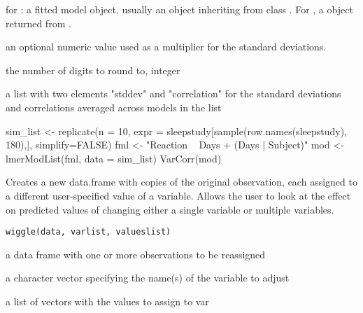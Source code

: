 \documentclass[letterpaper]{book}
\begin{document}
%
\begin{Arguments}
\begin{ldescription}
\item[\code{x}] for : a fitted model object, usually an object inheriting from
class . For , a
 object returned from .

\item[\code{sigma}] an optional numeric value used as a multiplier for the
standard deviations.

\item[\code{rdig}] the number of digits to round to, integer
\end{ldescription}
\end{Arguments}
%
\begin{Value}
a list with two elements "stddev" and "correlation" for the standard
deviations and correlations averaged across models in the list
\end{Value}
%
\begin{Examples}
\begin{ExampleCode}
sim_list <- replicate(n = 10,
        expr = sleepstudy[sample(row.names(sleepstudy), 180),],
        simplify=FALSE)
fml <- "Reaction ~ Days + (Days | Subject)"
mod <- lmerModList(fml, data = sim_list)
VarCorr(mod)
\end{ExampleCode}
\end{Examples}
%
\begin{Description}\relax
Creates a new data.frame with copies of the original observation,
each assigned to a different user-specified value of a variable. Allows the
user to look at the effect on predicted values of changing either a single variable
or multiple variables.
\end{Description}
%
\begin{Usage}
\begin{verbatim}
wiggle(data, varlist, valueslist)
\end{verbatim}
\end{Usage}
%
\begin{Arguments}
\begin{ldescription}
\item[\code{data}] a data frame with one or more observations to be reassigned

\item[\code{varlist}] a character vector specifying the name(s) of the variable to adjust

\item[\code{valueslist}] a list of vectors with the values to assign to var
\end{ldescription}
\end{Arguments}
\end{document}
